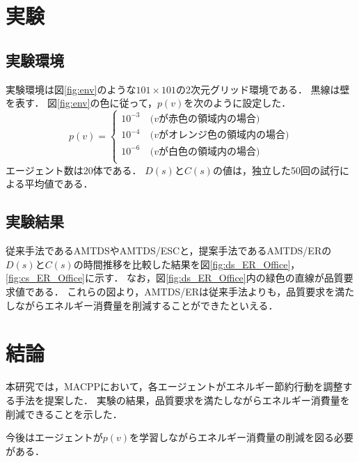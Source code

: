\documentclass[11pt,a4j,twocolumn]{jarticle}
\begin{document}
\section{実験}
\subsection{実験環境}
  実験環境は図\ref{fig:env}のような$101 \times 101$の2次元グリッド環境である．
  黒線は壁を表す．
  図\ref{fig:env}の色に従って，$p(v)$を次のように設定した．
  \[
    p(v) = 
    \begin{cases}
      10^{-3}\ & \textrm{($v$が赤色の領域内の場合)}\\
      10^{-4}\ & \textrm{($v$がオレンジ色の領域内の場合)}\\
      10^{-6}\ & \textrm{($v$が白色の領域内の場合)}\\
    \end{cases}
  \]
  エージェント数は20体である．
  $D(s)$と$C(s)$の値は，独立した50回の試行による平均値である．

  \subsection{実験結果}
  従来手法であるAMTDSやAMTDS/ESCと，提案手法であるAMTDS/ERの$D(s)$と$C(s)$の時間推移を比較した結果を図\ref{fig:ds_ER_Office}，\ref{fig:cs_ER_Office}に示す．
  なお，図\ref{fig:ds_ER_Office}内の緑色の直線が品質要求値である．
  これらの図より，AMTDS/ERは従来手法よりも，品質要求を満たしながらエネルギー消費量を削減することができたといえる．

\section{結論}
本研究では，MACPPにおいて，各エージェントがエネルギー節約行動を調整する手法を提案した．
実験の結果，品質要求を満たしながらエネルギー消費量を削減できることを示した．
\par

今後はエージェントが$p(v)$を学習しながらエネルギー消費量の削減を図る必要がある．



\end{document}
